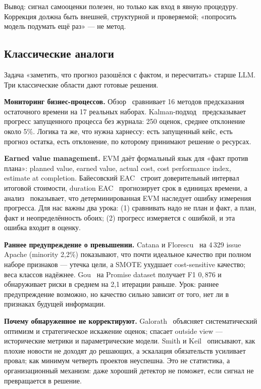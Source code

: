 \documentclass[11pt,a4paper]{article}
\begin{document}
Вывод: сигнал самооценки полезен, но только как вход в явную процедуру.
Коррекция должна быть внешней, структурной и проверяемой; «попросить
модель подумать ещё раз» — не метод.

\subsection{Классические аналоги}

Задача «заметить, что прогноз разошёлся с фактом, и пересчитать» старше
LLM. Три классические области дают готовые решения.

\textbf{Мониторинг бизнес-процессов.} Обзор~\cite{verenich2019remaining}
сравнивает 16 методов предсказания остаточного времени на 17 реальных
наборах. Kalman-подход~\cite{arnold2021kalman} предсказывает прогресс
запущенного процесса без журнала: 250 оценок, среднее отклонение около
5\%. Логика та же, что нужна харнессу: есть запущенный кейс, есть прогноз
остатка, есть отклонение, по которому принимают решение о ресурсах.

\textbf{Earned value management.} EVM даёт формальный язык для «факт
против плана»: planned value, earned value, actual cost, cost performance
index, estimate at completion. Байесовский EAC~\cite{caron2012bayesian}
строит доверительный интервал итоговой стоимости, duration
EAC~\cite{sackey2020duration} прогнозирует срок в единицах времени, а
анализ~\cite{almeida2021evm} показывает, что детерминированная EVM
наследует ошибку измерения прогресса. Для нас важны два урока: (1)
сравнивать надо не план и факт, а план, факт и неопределённость обоих;
(2) прогресс измеряется с ошибкой, и эта ошибка входит в оценку.

\textbf{Раннее предупреждение о превышении.} Catana и
Florescu~\cite{catana2026resampling} на 4\,329 issue Apache (minority
2{,}2\%) показывают, что почти идеальное качество при полном наборе
признаков — утечка цели, а SMOTE ухудшает cost-sensitive качество; веса
классов надёжнее. Gou~\cite{gou2026earlywarning} на Promise dataset
получает F1 $0{,}876$ и обнаруживает риски в среднем на 2{,}1 итерации
раньше. Урок: раннее предупреждение возможно, но качество сильно зависит
от того, нет ли в признаках будущей информации.

\textbf{Почему обнаруженное не корректируют.} Galorath~\cite{galorath2015estimates}
объясняет систематический оптимизм и стратегическое искажение оценок;
спасает outside view — исторические метрики и параметрические модели.
Smith и Keil~\cite{smith1999badnews} описывают, как плохие новости не
доходят до решающих, а эскалация обязательств усиливает провал; как
минимум четверть проектов неуспешна. Это не статистика, а организационный
механизм: даже хороший детектор не поможет, если сигнал не превращается в
решение.
\end{document}
